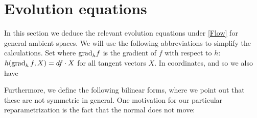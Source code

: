 \section{Evolution equations}
In this section we deduce the relevant evolution equations under \eqref{Flow} for general ambient spaces.
We will use the following abbreviations to simplify the calculations. Set
where $\mathrm{grad}_h f$ is the gradient of $f$ with respect to $h$: $h(\operatorname{grad}_h f, X) = df \cdot X$ for all tangent vectors $X$. In coordinates,
and so we also have

Furthermore, we define the following bilinear forms,
where we point out that these are not symmetric in general.
One motivation for our particular reparametrization is the fact that the normal does not move:

